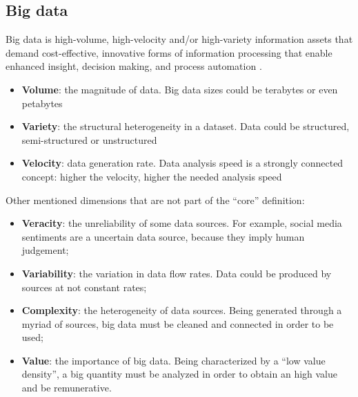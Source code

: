 \documentclass[\main/main.tex]{subfiles}
\begin{document}
\subsection{Big data}
Big data \cite{Gandomi2015BeyondTH} is high-volume, high-velocity and/or high-variety information assets that demand cost-effective, innovative forms of information processing that enable enhanced insight, decision making, and process automation \cite{bigdatagartner}.
\begin{itemize}
    \item \textbf{Volume}: the magnitude of data. Big data sizes could be terabytes or even petabytes
    \item \textbf{Variety}: the structural heterogeneity in a dataset. Data could be structured, semi-structured or unstructured
    \item \textbf{Velocity}: data generation rate. Data analysis speed is a strongly connected concept: higher the velocity, higher the needed analysis speed
\end{itemize}
Other mentioned dimensions that are not part of the ``core'' definition:
\begin{itemize}
    \item \textbf{Veracity}: the unreliability of some data sources. For example, social media sentiments are a uncertain data source, because they imply human judgement;
    \item \textbf{Variability}: the variation in data flow rates. Data could be produced by sources at not constant rates;
    \item \textbf{Complexity}: the heterogeneity of data sources. Being generated through a myriad of sources, big data must be cleaned and connected in order to be used;
    \item \textbf{Value}: the importance of big data. Being characterized by a ``low value density'', a big quantity must be analyzed in order to obtain an high value and be remunerative.
\end{itemize}
\end{document}
